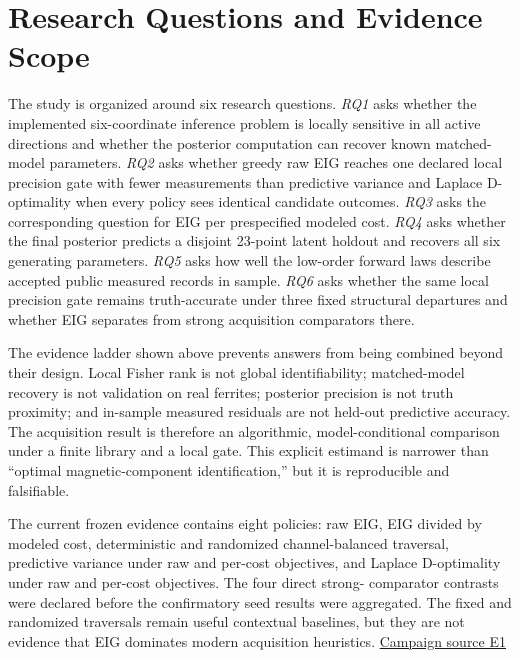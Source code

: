 \hypertarget{research-questions-and-evidence-scope}{%
\section{Research Questions and Evidence
Scope}\label{research-questions-and-evidence-scope}}

The study is organized around six research questions. \emph{RQ1} asks
whether the implemented six-coordinate inference problem is locally
sensitive in all active directions and whether the posterior computation
can recover known matched-model parameters. \emph{RQ2} asks whether
greedy raw EIG reaches one declared local precision gate with fewer
measurements than predictive variance and Laplace D-optimality when
every policy sees identical candidate outcomes. \emph{RQ3} asks the
corresponding question for EIG per prespecified modeled cost. \emph{RQ4}
asks whether the final posterior predicts a disjoint 23-point latent
holdout and recovers all six generating parameters. \emph{RQ5} asks how
well the low-order forward laws describe accepted public measured
records in sample. \emph{RQ6} asks whether the same local precision gate
remains truth-accurate under three fixed structural departures and
whether EIG separates from strong acquisition comparators there.

The evidence ladder shown above prevents answers from being combined
beyond their design. Local Fisher rank is not global identifiability;
matched-model recovery is not validation on real ferrites; posterior
precision is not truth proximity; and in-sample measured residuals are
not held-out predictive accuracy. The acquisition result is therefore an
algorithmic, model-conditional comparison under a finite library and a
local gate. This explicit estimand is narrower than ``optimal
magnetic-component identification,'' but it is reproducible and
falsifiable.

The current frozen evidence contains eight policies: raw EIG, EIG
divided by modeled cost, deterministic and randomized channel-balanced
traversal, predictive variance under raw and per-cost objectives, and
Laplace D-optimality under raw and per-cost objectives. The four direct
strong- comparator contrasts were declared before the confirmatory seed
results were aggregated. The fixed and randomized traversals remain
useful contextual baselines, but they are not evidence that EIG
dominates modern acquisition heuristics.
\href{https://github.com/hoangduong6210/EIG-bayesian-for-Recover-potential-Physical-Parameter-of-MagComponent/blob/a3e6326621d90123e5661c17e2d562fb0f5e0a41/wiki/evidence/Evidence-Sources.md\#e1}{Campaign
source E1}

